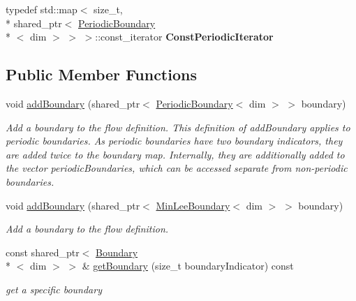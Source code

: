 \begin{DoxyCompactItemize}
\item 
\hypertarget{classnatrium_1_1BoundaryCollection_a132c389d4a4c65e2fad4c428c7183f8b}{typedef std\-::map$<$ size\-\_\-t, \\*
shared\-\_\-ptr$<$ \hyperlink{classnatrium_1_1PeriodicBoundary}{Periodic\-Boundary}\\*
$<$ dim $>$ $>$ $>$\-::const\-\_\-iterator {\bfseries Const\-Periodic\-Iterator}}\label{classnatrium_1_1BoundaryCollection_a132c389d4a4c65e2fad4c428c7183f8b}

\end{DoxyCompactItemize}
\subsection*{Public Member Functions}
\begin{DoxyCompactItemize}
\item 
void \hyperlink{classnatrium_1_1BoundaryCollection_a60d5efd5fa9bf2107705ee1a38508dd4}{add\-Boundary} (shared\-\_\-ptr$<$ \hyperlink{classnatrium_1_1PeriodicBoundary}{Periodic\-Boundary}$<$ dim $>$ $>$ boundary)
\begin{DoxyCompactList}\small\item\em Add a boundary to the flow definition. This definition of add\-Boundary applies to periodic boundaries. As periodic boundaries have two boundary indicators, they are added twice to the boundary map. Internally, they are additionally added to the vector periodic\-Boundaries, which can be accessed separate from non-\/periodic boundaries. \end{DoxyCompactList}\item 
void \hyperlink{classnatrium_1_1BoundaryCollection_ac8ad257c880937c59baad2d646392d7d}{add\-Boundary} (shared\-\_\-ptr$<$ \hyperlink{classnatrium_1_1MinLeeBoundary}{Min\-Lee\-Boundary}$<$ dim $>$ $>$ boundary)
\begin{DoxyCompactList}\small\item\em Add a boundary to the flow definition. \end{DoxyCompactList}\item 
const shared\-\_\-ptr$<$ \hyperlink{classnatrium_1_1Boundary}{Boundary}\\*
$<$ dim $>$ $>$ \& \hyperlink{classnatrium_1_1BoundaryCollection_adacc8205b74bdc7344161e73f1acadca}{get\-Boundary} (size\-\_\-t boundary\-Indicator) const 
\begin{DoxyCompactList}\small\item\em get a specific boundary \end{DoxyCompactList}\item 

\end{DoxyCompactItemize}
